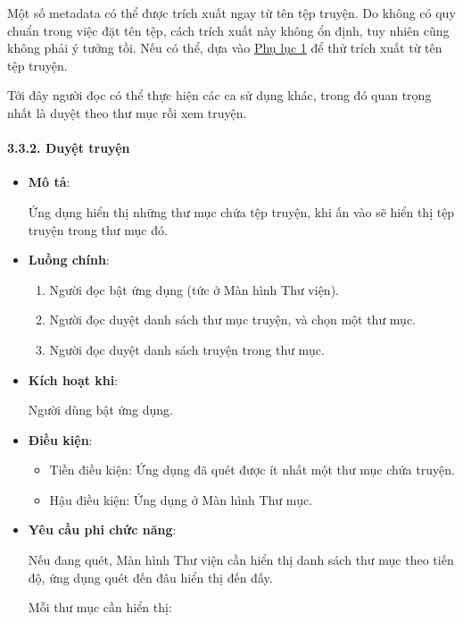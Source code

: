 \documentclass[
]{article}
\providecommand{\tightlist}{%
  \setlength{\itemsep}{0pt}\setlength{\parskip}{0pt}}
\begin{document}
Một số metadata có thể được trích xuất ngay từ tên tệp truyện. Do không
có quy chuẩn trong việc đặt tên tệp, cách trích xuất này không ổn định,
tuy nhiên cũng không phải ý tưởng tồi. Nếu có thể, dựa vào
\protect\hyperlink{P8.1-metadata}{Phụ lục 1} để thử trích xuất từ tên
tệp truyện.

Tới đây người đọc có thể thực hiện các ca sử dụng khác, trong đó quan
trọng nhất là duyệt theo thư mục rồi xem truyện.

\hypertarget{duyux1ec7t-truyux1ec7n}{%
\paragraph{\texorpdfstring{3.3.2. Duyệt truyện
}{3.3.2. Duyệt truyện }}\label{duyux1ec7t-truyux1ec7n}}

\begin{itemize}
\item
  \textbf{Mô tả}:

  Ứng dụng hiển thị những thư mục chứa tệp truyện, khi ấn vào sẽ hiển
  thị tệp truyện trong thư mục đó.
\item
  \textbf{Luồng chính}:

  \begin{enumerate}
  \def\labelenumi{\arabic{enumi}.}
  \tightlist
  \item
    Người đọc bật ứng dụng (tức ở Màn hình Thư viện).
  \item
    Người đọc duyệt danh sách thư mục truyện, và chọn một thư mục.
  \item
    Người đọc duyệt danh sách truyện trong thư mục.
  \end{enumerate}
\item
  \textbf{Kích hoạt khi}:

  Người dùng bật ứng dụng.
\item
  \textbf{Điều kiện}:

  \begin{itemize}
  \tightlist
  \item
    Tiền điều kiện: Ứng dụng đã quét được ít nhất một thư mục chứa
    truyện.
  \item
    Hậu điều kiện: Ứng dụng ở Màn hình Thư mục.
  \end{itemize}
\item
  \textbf{Yêu cầu phi chức năng}:

  Nếu đang quét, Màn hình Thư viện cần hiển thị danh sách thư mục theo
  tiến độ, ứng dụng quét đến đâu hiển thị đến đấy.

  Mỗi thư mục cần hiển thị:


\end{itemize}
\end{document}
